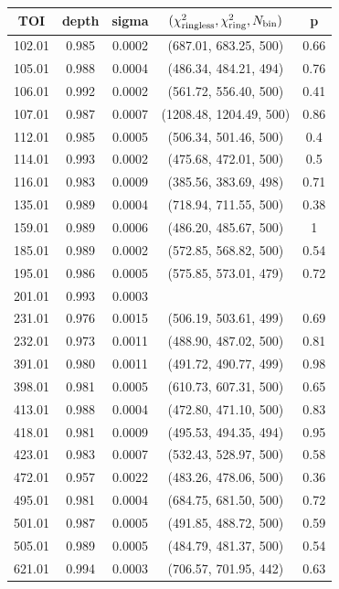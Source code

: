 \documentclass[fleqn,usenatbib, onecolumn,dvipdfmx]{mnras}
\begin{document}
\clearpage
\begin{center}
\begin{tabular}{|c|c|c|c|c|}
  \hline
  TOI & depth & sigma & $(\chi^{2}_{\rm{ringless}},\chi^{2}_{\rm{ring}}, N_{\rm{bin}})$ & p \\
  \hline
102.01 & 0.985 & 0.0002 & (687.01, 683.25, 500) & 0.66 \\
105.01 & 0.988 & 0.0004 & (486.34, 484.21, 494) & 0.76 \\
106.01 & 0.992 & 0.0002 & (561.72, 556.40, 500) & 0.41 \\
107.01 & 0.987 & 0.0007 & (1208.48, 1204.49, 500) & 0.86 \\
112.01 & 0.985 & 0.0005 & (506.34, 501.46, 500) & 0.4 \\
114.01 & 0.993 & 0.0002 & (475.68, 472.01, 500) & 0.5 \\
116.01 & 0.983 & 0.0009 & (385.56, 383.69, 498) & 0.71 \\
135.01 & 0.989 & 0.0004 & (718.94, 711.55, 500) & 0.38 \\
159.01 & 0.989 & 0.0006 & (486.20, 485.67, 500) & 1 \\
185.01 & 0.989 & 0.0002 & (572.85, 568.82, 500) & 0.54 \\
195.01 & 0.986 & 0.0005 & (575.85, 573.01, 479) & 0.72 \\
201.01 & 0.993 & 0.0003 &  &  \\
231.01 & 0.976 & 0.0015 & (506.19, 503.61, 499) & 0.69 \\
232.01 & 0.973 & 0.0011 & (488.90, 487.02, 500) & 0.81 \\
391.01 & 0.980 & 0.0011 & (491.72, 490.77, 499) & 0.98 \\
398.01 & 0.981 & 0.0005 & (610.73, 607.31, 500) & 0.65 \\
413.01 & 0.988 & 0.0004 & (472.80, 471.10, 500) & 0.83 \\
418.01 & 0.981 & 0.0009 & (495.53, 494.35, 494) & 0.95 \\
423.01 & 0.983 & 0.0007 & (532.43, 528.97, 500) & 0.58 \\
472.01 & 0.957 & 0.0022 & (483.26, 478.06, 500) & 0.36 \\
495.01 & 0.981 & 0.0004 & (684.75, 681.50, 500) & 0.72 \\
501.01 & 0.987 & 0.0005 & (491.85, 488.72, 500) & 0.59 \\
505.01 & 0.989 & 0.0005 & (484.79, 481.37, 500) & 0.54 \\
621.01 & 0.994 & 0.0003 & (706.57, 701.95, 442) & 0.63 \\

\end{tabular}
\end{center}
\end{document}
